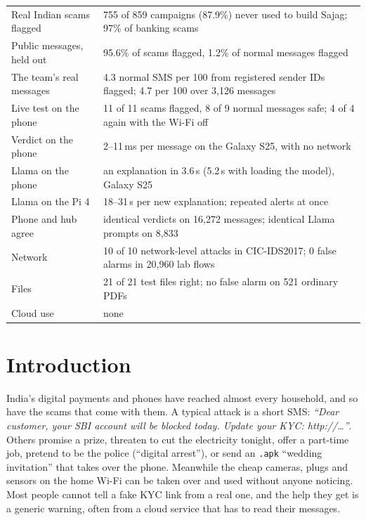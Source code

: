 \documentclass[11pt,a4paper]{article}
\newcommand{\code}[1]{\texttt{#1}}
\begin{document}
\vspace{4pt}
\begin{keybox}[title=Sajag in numbers (Phase 1)]
\begin{tabularx}{\linewidth}{@{}>{\raggedright\arraybackslash}p{4.6cm}X@{}}
Real Indian scams flagged & 755 of 859 campaigns (87.9\%) never used to build Sajag; 97\% of banking scams\\
Public messages, held out & 95.6\% of scams flagged, 1.2\% of normal messages flagged\\
The team's real messages & 4.3 normal SMS per 100 from registered sender IDs flagged; 4.7 per 100 over 3,126 messages\\
Live test on the phone & 11 of 11 scams flagged, 8 of 9 normal messages safe; 4 of 4 again with the Wi-Fi off\\
Verdict on the phone & 2--11\,ms per message on the Galaxy S25, with no network\\
Llama on the phone & an explanation in 3.6\,s (5.2\,s with loading the model), Galaxy S25\\
Llama on the Pi 4 & 18--31\,s per new explanation; repeated alerts at once\\
Phone and hub agree & identical verdicts on 16,272 messages; identical Llama prompts on 8,833\\
Network & 10 of 10 network-level attacks in CIC-IDS2017; 0 false alarms in 20,960 lab flows\\
Files & 21 of 21 test files right; no false alarm on 521 ordinary PDFs\\
Cloud use & none\\
\end{tabularx}
\end{keybox}

\clearpage
\tableofcontents
\clearpage

\section{Introduction}

India's digital payments and phones have reached almost every household, and so have the scams that come
with them. A typical attack is a short SMS: \emph{``Dear customer, your SBI account will be blocked today.
Update your KYC: http://\dots''}. Others promise a prize, threaten to cut the electricity tonight, offer a
part-time job, pretend to be the police (``digital arrest''), or send an \code{.apk} ``wedding invitation''
that takes over the phone. Meanwhile the cheap cameras, plugs and sensors on the home Wi-Fi can be taken
over and used without anyone noticing. Most people cannot tell a fake KYC link from a real one, and the
help they get is a generic warning, often from a cloud service that has to read their messages.
\end{document}
